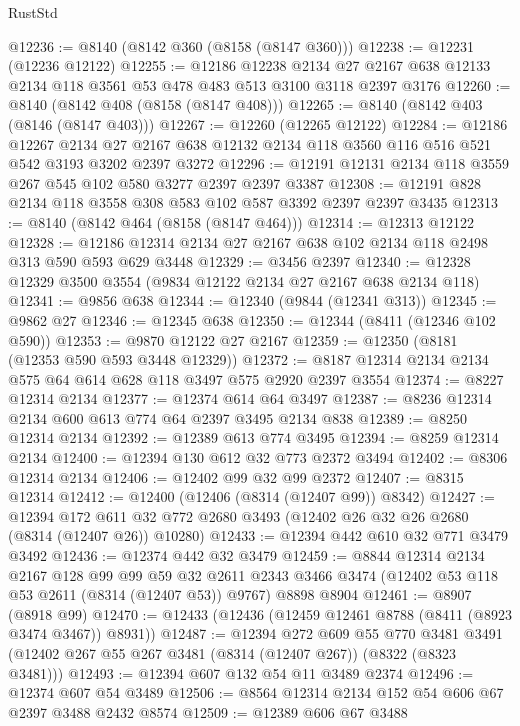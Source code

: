 \begin{lexlean}{RustStd}
\begin{coremodule}
@12236 := @8140 (@8142 @360 (@8158 (@8147 @360)))
@12238 := @12231 (@12236 @12122)
@12255 := @12186
    @12238
    @2134
    @27
    @2167
    @638
    @12133
    @2134
    @118
    @3561
    @53
    @478
    @483
    @513
    @3100
    @3118
    @2397
    @3176
@12260 := @8140 (@8142 @408 (@8158 (@8147 @408)))
@12265 := @8140 (@8142 @403 (@8146 (@8147 @403)))
@12267 := @12260 (@12265 @12122)
@12284 := @12186
    @12267
    @2134
    @27
    @2167
    @638
    @12132
    @2134
    @118
    @3560
    @116
    @516
    @521
    @542
    @3193
    @3202
    @2397
    @3272
@12296 := @12191 @12131 @2134 @118 @3559 @267 @545 @102 @580 @3277 @2397 @2397 @3387
@12308 := @12191 @828 @2134 @118 @3558 @308 @583 @102 @587 @3392 @2397 @2397 @3435
@12313 := @8140 (@8142 @464 (@8158 (@8147 @464)))
@12314 := @12313 @12122
@12328 := @12186 @12314 @2134 @27 @2167 @638 @102 @2134 @118 @2498 @313 @590 @593 @629 @3448
@12329 := @3456 @2397
@12340 := @12328 @12329 @3500 @3554 (@9834 @12122 @2134 @27 @2167 @638 @2134 @118)
@12341 := @9856 @638
@12344 := @12340 (@9844 (@12341 @313))
@12345 := @9862 @27
@12346 := @12345 @638
@12350 := @12344 (@8411 (@12346 @102 @590))
@12353 := @9870 @12122 @27 @2167
@12359 := @12350 (@8181 (@12353 @590 @593 @3448 @12329))
@12372 := @8187 @12314 @2134 @2134 @575 @64 @614 @628 @118 @3497 @575 @2920 @2397 @3554
@12374 := @8227 @12314 @2134
@12377 := @12374 @614 @64 @3497
@12387 := @8236 @12314 @2134 @600 @613 @774 @64 @2397 @3495 @2134 @838
@12389 := @8250 @12314 @2134
@12392 := @12389 @613 @774 @3495
@12394 := @8259 @12314 @2134
@12400 := @12394 @130 @612 @32 @773 @2372 @3494
@12402 := @8306 @12314 @2134
@12406 := @12402 @99 @32 @99 @2372
@12407 := @8315 @12314
@12412 := @12400 (@12406 (@8314 (@12407 @99)) @8342)
@12427 := @12394
    @172
    @611
    @32
    @772
    @2680
    @3493
    (@12402 @26 @32 @26 @2680 (@8314 (@12407 @26)) @10280)
@12433 := @12394 @442 @610 @32 @771 @3479 @3492
@12436 := @12374 @442 @32 @3479
@12459 := @8844
    @12314
    @2134
    @2167
    @128
    @99
    @99
    @59
    @32
    @2611
    @2343
    @3466
    @3474
    (@12402 @53 @118 @53 @2611 (@8314 (@12407 @53)) @9767)
    @8898
    @8904
@12461 := @8907 (@8918 @99)
@12470 := @12433 (@12436 (@12459 @12461 @8788 (@8411 (@8923 @3474 @3467)) @8931))
@12487 := @12394
    @272
    @609
    @55
    @770
    @3481
    @3491
    (@12402 @267 @55 @267 @3481 (@8314 (@12407 @267)) (@8322 (@8323 @3481)))
@12493 := @12394 @607 @132 @54 @11 @3489 @2374
@12496 := @12374 @607 @54 @3489
@12506 := @8564 @12314 @2134 @152 @54 @606 @67 @2397 @3488 @2432 @8574
@12509 := @12389 @606 @67 @3488

\end{coremodule}
\end{lexlean}
